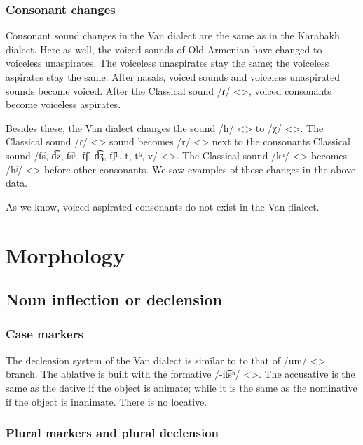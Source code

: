 \subsubsection{Consonant changes}

Consonant sound changes in the Van dialect are the same as in the Karabakh dialect. Here as well, the voiced sounds of Old Armenian have changed to voiceless unaspirates. The voiceless unaspirates stay the same; the voiceless aspirates stay the same. After nasals, voiced sounds and voiceless unaspirated sounds become voiced. After the Classical sound /ɾ/ <>, voiced consonants become voiceless aspirates. 

Besides these, the Van dialect changes the sound /h/ <> to /χ/ <>. The Classical sound /ɾ/ <> sound becomes /r/ <> next to the consonants Classical sound /t͡s, d͡z, t͡sʰ, t͡ʃ, d͡ʒ, t͡ʃʰ, t, tʰ, v/ <>. The Classical sound /kʰ/ <> becomes /hʲ/ <> before other consonants. We saw examples of these changes in the above data. 


\begin{adjarianpage}\label{page:143}\end{adjarianpage}%

As we know, voiced aspirated consonants do not exist in the Van dialect. 

\section{Morphology}
\subsection{Noun inflection or declension}

\subsubsection{Case markers}
The declension system of the Van dialect is similar to to that of /um/ <> branch. The ablative is built with the formative /-it͡sʰ/ <>. The accusative is the same as the dative if the object is animate; while it is the same as the nominative if the object is inanimate. There is no locative. 

\subsubsection{Plural markers and plural declension}

